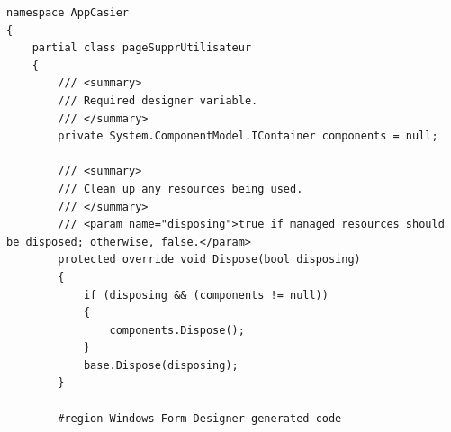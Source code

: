 \documentclass[main.tex]{subfiles}
\begin{document}
\begin{lstlisting}
namespace AppCasier
{
    partial class pageSupprUtilisateur
    {
        /// <summary>
        /// Required designer variable.
        /// </summary>
        private System.ComponentModel.IContainer components = null;

        /// <summary>
        /// Clean up any resources being used.
        /// </summary>
        /// <param name="disposing">true if managed resources should be disposed; otherwise, false.</param>
        protected override void Dispose(bool disposing)
        {
            if (disposing && (components != null))
            {
                components.Dispose();
            }
            base.Dispose(disposing);
        }

        #region Windows Form Designer generated code


\end{lstlisting}
\end{document}
